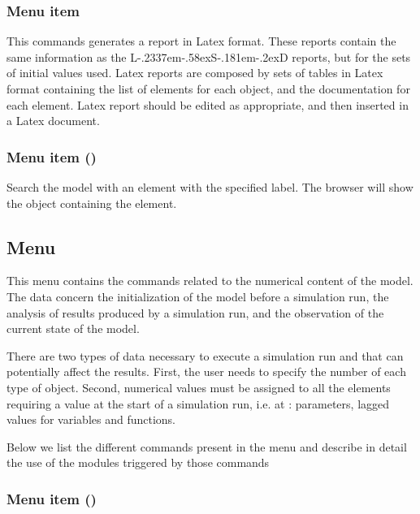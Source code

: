 \documentclass [11pt,a4paper] {book}
\def\LsD{{L\kern-.2337em\lower-.58ex\hbox{S}\kern-.181em\lower-.2ex\hbox{D}}\xspace}
\begin{document}
\subsubsection{Menu item  }

This commands generates a report in Latex format. These reports contain the same information as the \LsD reports, but for the sets of initial values used. Latex reports are composed by sets of tables in Latex format containing the list of elements for each object, and the documentation for each element. Latex report should be edited as appropriate, and then inserted in a Latex document.




\subsubsection{Menu item  ()}

Search the model with an element with the specified label. The browser will show the object containing the element.



\subsection{Menu }

This menu contains the commands related to the numerical content of the model. The data concern the initialization of the model before a simulation run, the analysis of results produced by a simulation run, and the observation of the current state of the model.

There are two types of data necessary to execute a simulation run and that can potentially affect the results. First, the user needs to specify the number of each type of object. Second, numerical values must be assigned to all the elements requiring a value at the start of a simulation run, i.e. at : parameters, lagged values for variables and functions.

Below we list the different commands present in the menu and describe in detail the use of the modules triggered by those commands

\subsubsection{Menu item  ()}
\end{document}

